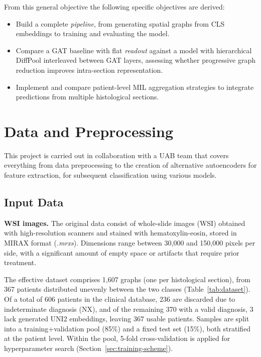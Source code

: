 \documentclass[10pt,a4paper,twocolumn,twoside]{article}
\begin{document}
From this general objective the following specific objectives are derived:
\begin{itemize}
    \item Build a complete \textit{pipeline}, from generating spatial graphs
    from CLS embeddings to training and evaluating the model.
    \item Compare a GAT baseline with flat \textit{readout} against a model with
    hierarchical DiffPool interleaved between GAT layers, assessing whether progressive
    graph reduction improves intra-section representation.
    \item Implement and compare patient-level MIL aggregation strategies to integrate
    predictions from multiple histological sections.
\end{itemize}

\section{Data and Preprocessing}

This project is carried out in collaboration with a UAB team that covers everything from data
preprocessing to the creation of alternative autoencoders for feature extraction, for
subsequent classification using various models.

\subsection{Input Data}

\textbf{WSI images.} The original data consist of whole-slide images (WSI) obtained with high-resolution scanners and
stained with hematoxylin-eosin, stored in MIRAX format (\textit{.mrxs}). Dimensions range between
30,000 and 150,000 pixels per side, with a significant amount of empty space or artifacts that
require prior treatment.

The effective dataset comprises 1,607 graphs (one per histological section), from
367 patients distributed unevenly between the two classes
(Table~\ref{tab:dataset}). Of a total of 606 patients in the clinical database, 236 are discarded
due to indeterminate diagnosis (NX), and of the remaining 370 with a valid diagnosis, 3 lack
generated UNI2 embeddings, leaving 367 usable patients. Samples are split into a training+validation pool (85\%) and a
fixed test set (15\%), both stratified at the patient level. Within the pool, 5-fold
cross-validation is applied for hyperparameter search (Section~\ref{sec:training-scheme}).
\end{document}
